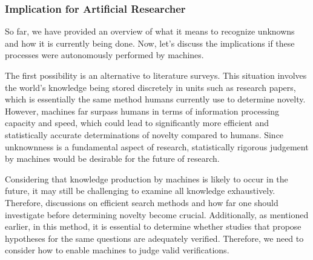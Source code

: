 \subsubsection{Implication for Artificial Researcher}
So far, we have provided an overview of what it means to recognize unknowns and how it is currently being done. Now, let's discuss the implications if these processes were autonomously performed by machines.

The first possibility is an alternative to literature surveys. This situation involves the world's knowledge being stored discretely in units such as research papers, which is essentially the same method humans currently use to determine novelty. However, machines far surpass humans in terms of information processing capacity and speed, which could lead to significantly more efficient and statistically accurate determinations of novelty compared to humans. Since unknownness is a fundamental aspect of research, statistically rigorous judgement by machines would be desirable for the future of research.


Considering that knowledge production by machines is likely to occur in the future, it may still be challenging to examine all knowledge exhaustively. Therefore, discussions on efficient search methods and how far one should investigate before determining novelty become crucial. Additionally, as mentioned earlier, in this method, it is essential to determine whether studies that propose hypotheses for the same questions are adequately verified. Therefore, we need to consider how to enable machines to judge valid verifications.

